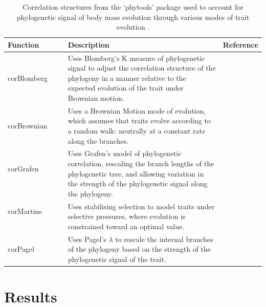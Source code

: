 \documentclass[11pt]{article}
\begin{document}
\centering
\begin{table}[!b]
\justifying
\captionsetup{width=0.93\textwidth, justification=raggedright, singlelinecheck=false, skip=4pt}
\caption{Correlation structures from the `phytools' package used to account for phylogenetic signal of body mass evolution through various modes of trait evolution \citep{phytools}.} 
\label{table:phylo_models}
\begin{tabular}{>{\raggedright}p{2cm}p{10.4cm}p{2.4cm}} \hline
\centering
\textbf{Function}        & \textbf{Description}  & \textbf{Reference} \\ \hline
corBlomberg         & Uses Blomberg's K measure of phylogenetic signal to adjust the correlation structure of the phylogeny in a manner relative to the expected evolution of the trait under Brownian motion. &  {\normalsize\citep{blomberg}} \\[1.25cm]
corBrownian       & Uses a Brownian Motion mode of evolution, which assumes that traits evolve according to a random walk: neutrally at a constant rate along the branches. & {\normalsize\citep{brownian}}\\[1.25cm]
corGrafen ~~~~~~~~~~~~~ & Uses Grafen's model of phylogenetic correlation, rescaling the branch lengths of the phylogenetic tree, and allowing variation in the strength of the phylogenetic signal along the phylogeny.  & {\normalsize\citep{grafen}}\\[1.25cm]
corMartins   ~~~~~~        & Uses stabilising selection to model traits under selective pressures, where evolution is constrained toward an optimal value. &{\normalsize\citep{brownian}} \\[0.75cm]
corPagel  ~~~~     & Uses Pagel's $\lambda$ to rescale the internal branches of the phylogeny based on the strength of the phylogenetic signal of the trait. & {\normalsize\citep{Pagel}}   \\ \hline
\end{tabular}
\end{table}

\pagebreak
\clearpage
\justifying


\section{Results}
\end{document}
